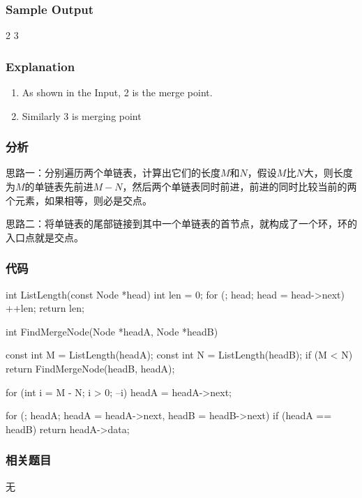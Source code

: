 \subsubsection{Sample Output}
\begin{Code}
2
3
\end{Code}


\subsubsection{Explanation}
\begin{enumerate}
\item As shown in the Input, 2 is the merge point.
\item Similarly 3 is merging point
\end{enumerate}


\subsubsection{分析}
思路一：分别遍历两个单链表，计算出它们的长度$M$和$N$，假设$M$比$N$大，则长度为$M$的单链表先前进$M-N$，然后两个单链表同时前进，前进的同时比较当前的两个元素，如果相等，则必是交点。

思路二：将单链表的尾部链接到其中一个单链表的首节点，就构成了一个环，环的入口点就是交点。


\subsubsection{代码}
\begin{Code}
int ListLength(const Node *head) {
    int len = 0;
    for (; head; head = head->next)
        ++len;
    return len;
}

int FindMergeNode(Node *headA, Node *headB) {
    const int M = ListLength(headA);
    const int N = ListLength(headB);
    if (M < N) return FindMergeNode(headB, headA);

    for (int i = M - N; i > 0; --i)
        headA = headA->next;

    for (; headA; headA = headA->next, headB = headB->next) {
        if (headA == headB)
            return headA->data;
    }
}
\end{Code}


\subsubsection{相关题目}
\begindot
\item 无
\myenddot


